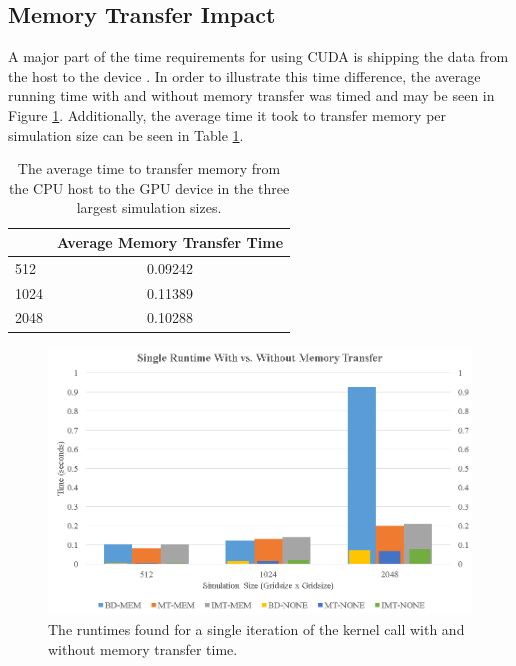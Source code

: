 \subsection*{Memory Transfer Impact}
A major part of the time requirements for using CUDA is shipping the data from the host to the device \cite{cudabyexample}. In order to illustrate this time difference, the average running time with and without memory transfer was timed and may be seen in Figure \ref{fig:mem_comp}. Additionally, the average time it took to transfer memory per simulation size can be seen in Table \ref{table:mem_time}.
\begin{table}[H]
\centering
\caption{The average time to transfer memory from the CPU host to the GPU device in the three largest simulation sizes.}
\label{table:mem_time}
\begin{tabular}{l|c|}
\cline{2-2}
                           & \multicolumn{1}{l|}{Average Memory Transfer Time} \\ \hline
\multicolumn{1}{|l|}{512}  & 0.09242                                           \\ \hline
\multicolumn{1}{|l|}{1024} & 0.11389                                           \\ \hline
\multicolumn{1}{|l|}{2048} & 0.10288                                           \\ \hline
\end{tabular}
\end{table} 
\begin{figure}[H]
\centering
  \includegraphics[height=.4\textheight]{figures/results/mem_compare.png}
  \caption{The runtimes found for a single iteration of the kernel call with and without memory transfer time.}
  \label{fig:mem_comp}
\end{figure} 

